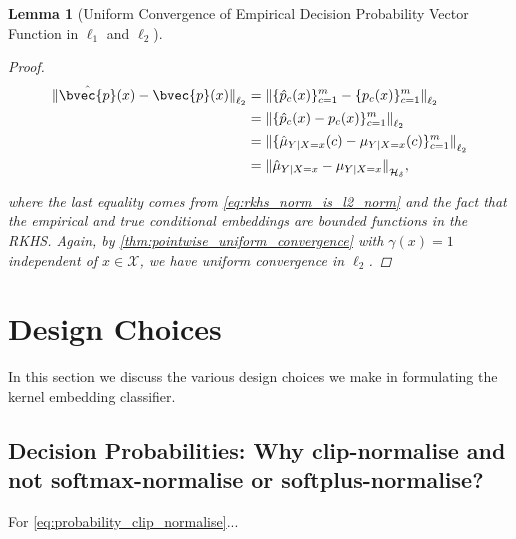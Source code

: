 \documentclass{article}
\newtheorem{lemma}{Lemma}[section]
\begin{document}
\begin{lemma}[Uniform Convergence of Empirical Decision Probability Vector Function in $\ell_{1}$ and $\ell_{2}$]
\begin{proof}
			\begin{equation}
			\begin{aligned}
				{\lVert \hat{\bvec{p}}(x)  - \bvec{p}(x) \rVert}_{\ell_{2}} &= {\lVert \{ \hat{p}_{c}(x) \}_{c = 1}^{m} - \{ p_{c}(x) \}_{c = 1}^{m} \rVert}_{\ell_{2}} \\
				&= {\lVert \{ \hat{p}_{c}(x) - p_{c}(x) \}_{c = 1}^{m} \rVert}_{\ell_{2}} \\
				&= {\lVert \{ \hat{\mu}_{Y | X = x}(c) - \mu_{Y | X = x}(c)\}_{c = 1}^{m} \rVert}_{\ell_{2}} \\
				&= {\lVert \hat{\mu}_{Y | X = x} - \mu_{Y | X = x}\rVert}_{\mathcal{H}_{\delta}},
			\end{aligned}
			\end{equation}
			
			where the last equality comes from \eqref{eq:rkhs_norm_is_l2_norm} and the fact that the empirical and true conditional embeddings are bounded functions in the RKHS. Again, by \cref{thm:pointwise_uniform_convergence} with $\gamma(x) = 1$ independent of $x \in \mathcal{X}$, we have uniform convergence in $\ell_{2}$.
		\end{proof}
		
	\end{lemma}
	
\section{Design Choices}
\label{app:design_choices}

	In this section we discuss the various design choices we make in formulating the kernel embedding classifier.

	\subsection{Decision Probabilities: Why clip-normalise and not softmax-normalise or softplus-normalise?}
	
		For \eqref{eq:probability_clip_normalise}...
		
\end{document}

